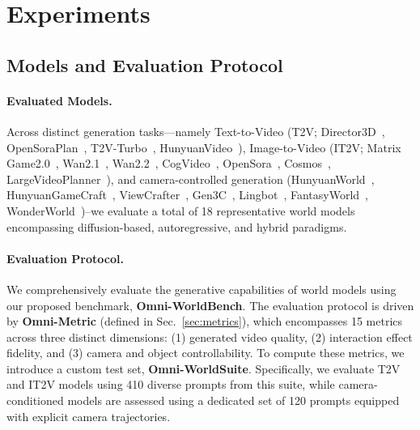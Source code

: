 \section{Experiments}
\label{sec:experiments}

\subsection{Models and Evaluation Protocol}

\paragraph{Evaluated Models.}
Across distinct generation tasks—namely Text-to-Video (T2V; Director3D~\cite{wu2024direct3dscalableimageto3dgeneration}, OpenSoraPlan~\cite{lin2024opensoraplan}, T2V-Turbo~\cite{li2024t2v-turbo}, HunyuanVideo~\cite{kong2024HunyuanVideo}), Image-to-Video (IT2V; Matrix Game2.0~\cite{he2025matrix}, Wan2.1~\cite{wan2025}, Wan2.2~\cite{wan2025}, CogVideo~\cite{hong2022CogVideo}, OpenSora~\cite{zheng2024opensora}, Cosmos~\cite{agarwal2025Cosmos}, LargeVideoPlanner~\cite{chen2025large}), and camera-controlled generation (HunyuanWorld~\cite{hyworld2025}, HunyuanGameCraft~\cite{li2025hunyuan}, ViewCrafter~\cite{yu2024viewcrafter}, Gen3C~\cite{ren2025gen3c}, Lingbot~\cite{team2026advancing}, FantasyWorld~\cite{dai2025fantasyworldgeometryconsistentworldmodeling}, WonderWorld~\cite{yu2025wonderworld})--we evaluate a total of 18 representative world models encompassing diffusion-based, autoregressive, and hybrid paradigms.

\paragraph{Evaluation Protocol.}
We comprehensively evaluate the generative capabilities of world models using our proposed benchmark, \textbf{Omni-WorldBench}. The evaluation protocol is driven by \textbf{Omni-Metric} (defined in Sec.~\ref{sec:metrics}), which encompasses 15 metrics across three distinct dimensions: (1) generated video quality, (2) interaction effect fidelity, and (3) camera and object controllability. To compute these metrics, we introduce a custom test set, \textbf{Omni-WorldSuite}. Specifically, we evaluate T2V and IT2V models using 410 diverse prompts from this suite, while camera-conditioned models are assessed using a dedicated set of 120 prompts equipped with explicit camera trajectories.


